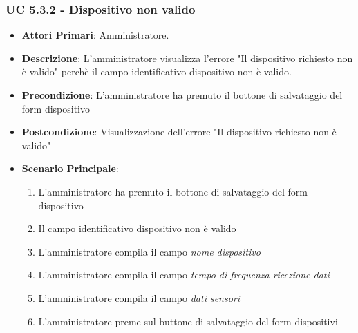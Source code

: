 			\subsubsection{UC 5.3.2 - Dispositivo non valido}
			\begin{itemize}
				\item \textbf{Attori Primari}: Amministratore.
				\item \textbf{Descrizione}: L'amministratore visualizza l'errore "Il dispositivo richiesto non è valido" perchè il campo identificativo dispositivo non è valido.
				\item \textbf{Precondizione}: L'amministratore ha premuto il bottone di salvataggio del form dispositivo
				\item \textbf{Postcondizione}: Visualizzazione dell'errore "Il dispositivo richiesto non è valido"
				\item \textbf{Scenario Principale}:
				\begin{enumerate}
					\item{L'amministratore ha premuto il bottone di salvataggio del form dispositivo}
					\item{Il campo identificativo dispositivo non è valido}
					\item{L'amministratore compila il campo \textit{nome dispositivo}}
					\item{L'amministratore compila il campo \textit{tempo di frequenza ricezione dati}}
					\item{L'amministratore compila il campo \textit{dati sensori}}
					\item{L'amministratore preme sul buttone di salvataggio del form dispositivi}
				\end{enumerate}
			\end{itemize}
			
